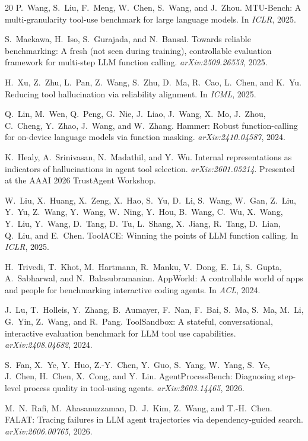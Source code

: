 \documentclass{article}
\begin{document}
{\begin{thebibliography}{20}
P.~Wang, S.~Liu, F.~Meng, W.~Chen, S.~Wang, and J.~Zhou.
\newblock MTU-Bench: A multi-granularity tool-use benchmark for large language models.
\newblock In \emph{ICLR}, 2025.

S.~Maekawa, H.~Iso, S.~Gurajada, and N.~Bansal.
\newblock Towards reliable benchmarking: A fresh (not seen during training), controllable evaluation framework for multi-step LLM function calling.
\newblock \emph{arXiv:2509.26553}, 2025.

H.~Xu, Z.~Zhu, L.~Pan, Z.~Wang, S.~Zhu, D.~Ma, R.~Cao, L.~Chen, and K.~Yu.
\newblock Reducing tool hallucination via reliability alignment.
\newblock In \emph{ICML}, 2025.

Q.~Lin, M.~Wen, Q.~Peng, G.~Nie, J.~Liao, J.~Wang, X.~Mo, J.~Zhou, C.~Cheng, Y.~Zhao, J.~Wang, and W.~Zhang.
\newblock Hammer: Robust function-calling for on-device language models via function masking.
\newblock \emph{arXiv:2410.04587}, 2024.

K.~Healy, A.~Srinivasan, N.~Madathil, and Y.~Wu.
\newblock Internal representations as indicators of hallucinations in agent tool selection.
\newblock \emph{arXiv:2601.05214}. Presented at the AAAI 2026 TrustAgent Workshop.

W.~Liu, X.~Huang, X.~Zeng, X.~Hao, S.~Yu, D.~Li, S.~Wang, W.~Gan, Z.~Liu, Y.~Yu, Z.~Wang, Y.~Wang, W.~Ning, Y.~Hou, B.~Wang, C.~Wu, X.~Wang, Y.~Liu, Y.~Wang, D.~Tang, D.~Tu, L.~Shang, X.~Jiang, R.~Tang, D.~Lian, Q.~Liu, and E.~Chen.
\newblock ToolACE: Winning the points of LLM function calling.
\newblock In \emph{ICLR}, 2025.

H.~Trivedi, T.~Khot, M.~Hartmann, R.~Manku, V.~Dong, E.~Li, S.~Gupta, A.~Sabharwal, and N.~Balasubramanian.
\newblock AppWorld: A controllable world of apps and people for benchmarking interactive coding agents.
\newblock In \emph{ACL}, 2024.

J.~Lu, T.~Holleis, Y.~Zhang, B.~Aumayer, F.~Nan, F.~Bai, S.~Ma, S.~Ma, M.~Li, G.~Yin, Z.~Wang, and R.~Pang.
\newblock ToolSandbox: A stateful, conversational, interactive evaluation benchmark for LLM tool use capabilities.
\newblock \emph{arXiv:2408.04682}, 2024.

S.~Fan, X.~Ye, Y.~Huo, Z.-Y.~Chen, Y.~Guo, S.~Yang, W.~Yang, S.~Ye, J.~Chen, H.~Chen, X.~Cong, and Y.~Lin.
\newblock AgentProcessBench: Diagnosing step-level process quality in tool-using agents.
\newblock \emph{arXiv:2603.14465}, 2026.

M.~N.~Rafi, M.~Ahasanuzzaman, D.~J.~Kim, Z.~Wang, and T.-H.~Chen.
\newblock FALAT: Tracing failures in LLM agent trajectories via dependency-guided search.
\newblock \emph{arXiv:2606.00765}, 2026.

\end{thebibliography}
}
\end{document}
